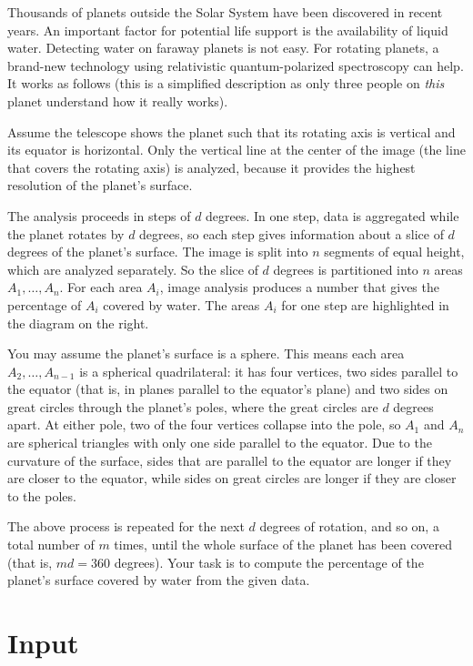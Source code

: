 
Thousands of planets outside the Solar System have been discovered in recent years.
An important factor for potential life support is the availability of liquid water.
Detecting water on faraway planets is not easy.
For rotating planets, a brand-new technology using relativistic quantum-polarized spectroscopy can help.
It works as follows (this is a simplified description as only three people on \emph{this} planet understand how it really works).

%
%
Assume the telescope shows the planet such that its rotating axis is vertical and its equator is horizontal.
Only the vertical line at the center of the image (the line that covers the rotating axis) is analyzed, because it provides the highest resolution of the planet's surface.

The analysis proceeds in steps of $d$ degrees.
In one step, data is aggregated while the planet rotates by $d$ degrees, so each step gives information about a slice of $d$ degrees of the planet's surface.
The image is split into $n$ segments of equal height, which are analyzed separately.
So the slice of $d$ degrees is partitioned into $n$ areas $A_1, \dots, A_n$.
For each area $A_i$, image analysis produces a number that gives the percentage of $A_i$ covered by water.
The areas $A_i$ for one step are highlighted in the diagram on the right.

You may assume the planet's surface is a sphere.
This means each area $A_2, \dots, A_{n-1}$ is a spherical quadrilateral: it has four vertices, two sides parallel to the equator (that is, in planes parallel to the equator's plane) and two sides on great circles through the planet's poles, where the great circles are $d$ degrees apart.
At either pole, two of the four vertices collapse into the pole, so $A_1$ and $A_n$ are spherical triangles with only one side parallel to the equator.
Due to the curvature of the surface, sides that are parallel to the equator are longer if they are closer to the equator, while sides on great circles are longer if they are closer to the poles.

The above process is repeated for the next $d$ degrees of rotation, and so on, a total number of $m$ times, until the whole surface of the planet has been covered (that is, $m d = 360$ degrees).
Your task is to compute the percentage of the planet's surface covered by water from the given data.

\section*{Input}

